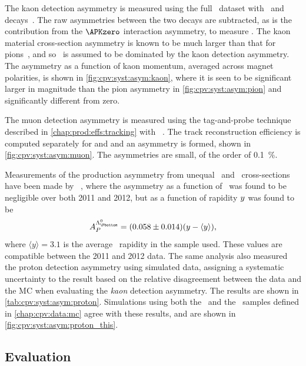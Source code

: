 The kaon detection asymmetry is measured using the full \runone\ dataset with 
\DpToKpipi\ and \decay{\PDplus}{\APKzero\Ppiplus} decays~\cite{Aaij:2014gsa}.
The raw asymmetries between the two decays are subtracted, as is the 
contribution from the $\APKzero$ interaction asymmetry, to measure \ADKpi.
The kaon material cross-section asymmetry is known to be much larger than that 
for pions~\cite{PDG2014}, and so \ADKpi\ is assumed to be dominated by the kaon 
detection asymmetry.
The asymmetry as a function of kaon momentum, averaged across magnet 
polarities, is shown in \cref{fig:cpv:syst:asym:kaon}, where it is seen to be 
significant larger in magnitude than the pion asymmetry in 
\cref{fig:cpv:syst:asym:pion} and significantly different from zero.

The muon detection asymmetry is measured using the tag-and-probe technique described in \cref{chap:prod:effs:tracking} with \JpsiTomumu~\cite{Stahl:2010261}.
The track reconstruction efficiency is computed separately for \Pmuon and 
\APmuon and an asymmetry is formed, shown in \cref{fig:cpv:syst:asym:muon}.
The asymmetries are small, of the order of \SI{0.1}{\percent}.

Measurements of the production asymmetry from unequal \PLambdab\ and 
\APLambdab\ cross-sections have been made by \lhcb~\cite{Aaij:2015fea}, where 
the asymmetry as a function of \pT\ was found to be negligible over both 2011 
and 2012, but as a function of rapidity $y$ was found to be
\begin{equation}
  \APLb = (0.058 \pm 0.014)(y - \langle{y}\rangle),
\end{equation}
where $\langle{y}\rangle = 3.1$ is the average \PLambdab\ rapidity in the 
sample used.
These values are compatible between the 2011 and 2012 data.
The same analysis also measured the proton detection asymmetry using simulated 
data, assigning a systematic uncertainty to the result based on the relative 
disagreement between the data and the \ac{MC} when evaluating the \emph{kaon} 
detection asymmetry.
The results are shown in \cref{tab:cpv:syst:asym:proton}.
Simulations using both the \pKK\ and the \ppipi\ samples defined in 
\cref{chap:cpv:data:mc} agree with these results, and are shown in 
\cref{fig:cpv:syst:asym:proton_this}.

\subsection{Evaluation}
\label{chap:cpv:syst:asym:eval}

